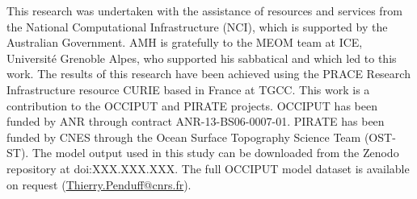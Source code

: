 \documentclass{agujournal2019}
\begin{document}
\acknowledgments
This research was undertaken with the assistance of resources and services from the National Computational Infrastructure (NCI), which is supported by the Australian Government.
AMH is gratefully to the MEOM team at ICE, Universit{\'e} Grenoble Alpes, who supported his sabbatical and which led to this work. The results of this research have been achieved using the PRACE Research Infrastructure resource CURIE based in France at TGCC. This work is a contribution to the OCCIPUT and PIRATE projects. OCCIPUT has been funded by ANR through contract ANR-13-BS06-0007-01. PIRATE has been funded by CNES through the Ocean Surface Topography Science Team (OST-ST). {\color{red}The model output used in this study can be downloaded from the Zenodo repository at doi:XXX.XXX.XXX. The full OCCIPUT model dataset is available on request (\href{mailto:Thierry.Penduff@cnrs.fr}{Thierry.Penduff@cnrs.fr}).}


\end{document}
